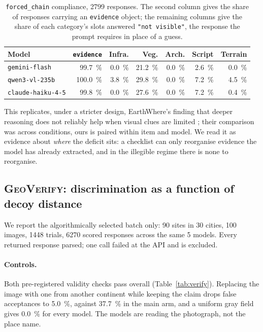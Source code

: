 \documentclass[10pt,a4paper]{article}
\begin{document}
\begin{table}[!htbp]
\centering
\small
\caption{\texttt{forced\_chain} compliance, \num{2799} responses. The second
column gives the share of responses carrying an \texttt{evidence} object; the
remaining columns give the share of each category's slots answered
\texttt{"not visible"}, the response the prompt requires in place of a guess.}
\label{tab:chaincomply}
\begin{tabular}{lrrrrrr}
\toprule
Model & \texttt{evidence} & Infra. & Veg. & Arch. & Script & Terrain \\
\midrule
\texttt{gemini-flash}     & \SI{99.7}{\percent}  & \SI{0.0}{\percent} & \SI{21.2}{\percent} & \SI{0.0}{\percent} & \SI{2.6}{\percent} & \SI{0.0}{\percent} \\
\texttt{qwen3-vl-235b}    & \SI{100.0}{\percent} & \SI{3.8}{\percent} & \SI{29.8}{\percent} & \SI{0.0}{\percent} & \SI{7.2}{\percent} & \SI{4.5}{\percent} \\
\texttt{claude-haiku-4-5} & \SI{99.8}{\percent}  & \SI{0.0}{\percent} & \SI{27.6}{\percent} & \SI{0.0}{\percent} & \SI{7.2}{\percent} & \SI{0.4}{\percent} \\
\bottomrule
\end{tabular}
\end{table}

This replicates, under a stricter design, EarthWhere's finding that deeper
reasoning does not reliably help when visual clues are limited
\citep{earthwhere}; their comparison was across conditions, ours is paired
within item and model. We read it as evidence about \emph{where} the deficit
sits: a checklist can only reorganise evidence the model has already extracted,
and in the illegible regime there is none to reorganise.

\subsection{\textsc{GeoVerify}: discrimination as a function of decoy distance}
\label{sec:results-verify}

We report the algorithmically selected batch only: \num{90} sites in \num{30}
cities, \num{100} images, \num{1448} trials, \num{6270} scored responses across
the same \num{5} models. Every returned response parsed; one call failed at
the API and is excluded.

\paragraph{Controls.} Both pre-registered validity checks pass overall
(Table~\ref{tab:verify}). Replacing the image with one from another
continent while keeping the claim drops false acceptances to \SI{5.0}{\percent},
against \SI{37.7}{\percent} in the main arm, and a uniform gray field gives
\SI{0.0}{\percent} for every model. The models are reading the photograph, not
the place name.
\end{document}
